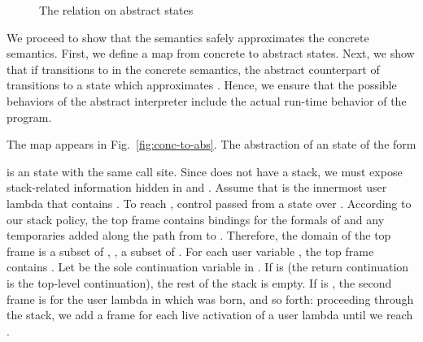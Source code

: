 \documentclass{LMCS}
\theoremstyle{definition} \newtheorem{property}[thm]{Property}
\begin{document}
\begin{figure}[!t]
  {\footnotesize
    {\renewcommand{\arraystretch}{1.7}
      }}
  \caption{The  relation on abstract states\label{fig:less-than}}
\end{figure}

We proceed to show that the \cfat{} semantics safely approximates the concrete
semantics.
First, we define a map \ctoa{\cdot} from concrete to abstract states.
Next, we show that if \cstat{} transitions to  in the concrete
semantics, the abstract counterpart \ctoa{\cstat} of \cstat{} transitions to
a state  which approximates .
Hence, we ensure that the possible behaviors of the abstract interpreter include
the actual run-time behavior of the program.

The map \ctoa{\cdot} appears in Fig.~\ref{fig:conc-to-abs}.
The abstraction of an \deval{} state \cstat{} of the form

is an \daeval{} state \astat{} with the same call site.
Since \cstat{} does not have a stack, we must expose stack-related information 
hidden in \cbenv{} and \cvenv.
Assume that  is the innermost user lambda that contains .
To reach , control passed from a \dauapply{} state  
over .
According to our stack policy, the top frame contains bindings for the 
formals of  and any temporaries added along the path from  
to \astat.
Therefore, the domain of the top frame is a subset of , \ie{},
a subset of \ltov{\psi}.
For each user variable ,
the top frame contains .
Let  be the sole continuation variable in \ltov{\psi}.
If  is \haltcont{} (the return continuation is the 
top-level continuation), the rest of the stack is empty.
If  is , the second frame is for
the user lambda in which \ilam{\gamma} was born, and so forth:
proceeding through the stack, we add a frame for each live activation of a 
user lambda until we reach \haltcont.
\end{document}
